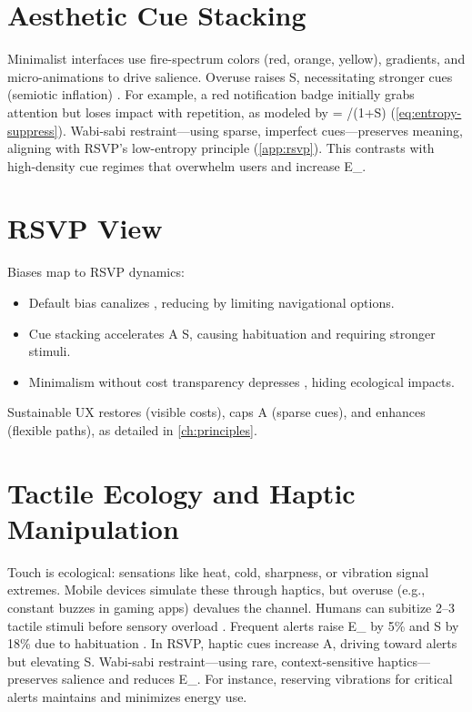 \documentclass[openany]{book}
\newcommand{\PhiS}{\Phi} %
\newcommand{\vvec}{\mathbf{v}} %
\newcommand{\Sent}{S} %
\newcommand{\Eint}{E_{\mathrm{int}}} %
\newcommand{\Auton}{\mathcal{A}} %
\begin{document}
\section{Aesthetic Cue Stacking}
\label{sec:aesthetic}
Minimalist interfaces use fire-spectrum colors (red, orange, yellow), gradients, and micro-animations to drive salience. Overuse raises \Sent{}, necessitating stronger cues (semiotic inflation) \citep{colak2024}. For example, a red notification badge initially grabs attention but loses impact with repetition, as modeled by  = \widehat{\sigma}/(1+\rho \Sent) (\cref{eq:entropy-suppress}). Wabi-sabi restraint---using sparse, imperfect cues---preserves meaning, aligning with RSVP’s low-entropy principle (\cref{app:rsvp}). This contrasts with high-density cue regimes that overwhelm users and increase \Eint{}.

\section{RSVP View}
\label{sec:illusion-rsvp}
Biases map to RSVP dynamics:
\begin{itemize}
  \item Default bias canalizes \vvec{}, reducing \Auton{} by limiting navigational options.
  \item Cue stacking accelerates A \to \Sent{}, causing habituation and requiring stronger stimuli.
  \item Minimalism without cost transparency depresses \PhiS{}, hiding ecological impacts.
\end{itemize}
Sustainable UX restores \PhiS{} (visible costs), caps A (sparse cues), and enhances \Auton{} (flexible paths), as detailed in \cref{ch:principles}.

\section{Tactile Ecology and Haptic Manipulation}
\label{sec:tactile}
Touch is ecological: sensations like heat, cold, sharpness, or vibration signal extremes. Mobile devices simulate these through haptics, but overuse (e.g., constant buzzes in gaming apps) devalues the channel. Humans can subitize 2--3 tactile stimuli before sensory overload \citep{gallace2006}. Frequent alerts raise \Eint{} by 5\% and \Sent{} by 18\% due to habituation \citep{colak2024}. In RSVP, haptic cues increase A, driving \vvec{} toward alerts but elevating \Sent{}. Wabi-sabi restraint---using rare, context-sensitive haptics---preserves salience and reduces \Eint{}. For instance, reserving vibrations for critical alerts maintains \PhiS{} and minimizes energy use.
\end{document}
